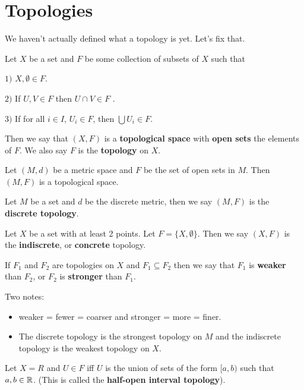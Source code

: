 

\section{Topologies} We haven't actually defined what a topology is yet. Let's fix that. 
\begin{definition}
	Let $X$ be a set and $F$ be some collection of subsets of $X$ such that
	
	$1)$ $X,\emptyset \in F$.
	
	$2)$ If $U,V \in F$ then $U\cap V \in F$ .
	
	$3)$ If for all $i\in I$, $U_{i} \in F$, then $\bigcup U_{i} \in F$.
	
	Then we say that $(X,F)$ is a \textbf{topological space} with \textbf{open sets} the elements of $F$. We also say $F$ is the \textbf{topology} on $X$. 
\end{definition}
\begin{example}
	Let $(M,d)$ be a metric space and $F$ be the set of open sets in $M$. Then $(M,F)$ is a topological space. 
\end{example}
\begin{definition}
	Let $M$ be a set and $d$ be the discrete metric, then we say $(M,F)$ is the \textbf{discrete topology}. 
\end{definition}
\begin{definition}
	Let $X$ be a set with at least 2 points. Let $F=\{X,\emptyset\}$. Then we say $(X,F)$ is the \textbf{indiscrete}, or \textbf{concrete} topology. 
\end{definition}
\begin{definition}
	If $F_{1}$ and $F_{2}$ are topologies on $X$ and $F_{1}\subseteq F_{2}$ then we say that $F_{1}$ is \textbf{weaker} than $F_{2}$, or $F_{2}$ is \textbf{stronger} than $F_{1}$. 
\end{definition}

Two notes: 
\begin{itemize}
	\item weaker = fewer = coarser and stronger = more = finer. 
	\item The discrete topology is the strongest topology on $M$ and the indiscrete topology is the weakest topology on $X$. 
\end{itemize}
\begin{example}
	Let $X=R$ and $U\in F$ iff $U$ is the union of sets of the form $[a,b)$ such that $a,b\in \mathbb R$. (This is called the \textbf{half-open interval topology}). 
\end{example}

